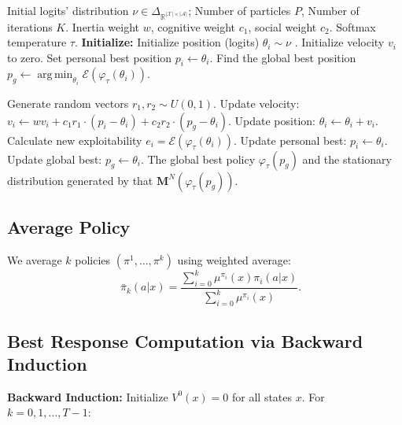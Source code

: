 \documentclass[10pt,twocolumn,letterpaper]{article}
\theoremstyle{definition}
\theoremstyle{remark}
\newcommand{\states}{\mathcal{X}}
\newcommand{\actions}{\mathcal{A}}
\DeclareMathOperator*{\argmin}{arg\,min}
\newcommand{\exploitability}{\mathcal{E}}
\begin{document}
\begin{algorithm}[H]
\small
\caption{Particle Swarm Optimization (PSO) for Exploitability Minimization}
\label{algo:pso}
\begin{algorithmic}[1]
    \REQUIRE Initial logits' distribution $\nu\in\Delta_{\mathbb{R}^{|\states|\times|\actions|}}$; Number of particles $P$, Number of iterations $K$. Inertia weight $w$, cognitive weight $c_1$, social weight $c_2$. Softmax temperature $\tau$.
    \STATE \textbf{Initialize:}
        \STATE Initialize position (logits) $\theta_i\sim\nu$ .
        \STATE Initialize velocity $v_i$ to zero.
        \STATE Set personal best position $p_i \gets \theta_i$.
    \ENDFOR
    \STATE Find the global best position $p_g \gets \argmin_{\theta_i} \exploitability(\varphi_{\tau}(\theta_i))$.

            \STATE Generate random vectors $r_1, r_2 \sim U(0, 1)$.
            \STATE Update velocity: $v_i \gets w v_i + c_1 r_1 \cdot (p_i - \theta_i) + c_2 r_2 \cdot (p_g - \theta_i)$.
            \STATE Update position: $\theta_i \gets \theta_i + v_i$.
            \STATE Calculate new exploitability $e_i = \exploitability(\varphi_{\tau}(\theta_i))$.
            \IF{$e_i < \exploitability(p_i)$}
                \STATE Update personal best: $p_i \gets \theta_i$.
            \ENDIF
            \IF{$e_i < \exploitability(p_g)$}
                \STATE Update global best: $p_g \gets \theta_i$.
            \ENDIF
        \ENDFOR
    \ENDFOR
    \ENSURE The global best policy $\varphi_{\tau}(p_g)$ and the stationary distribution generated by that $\mathbf{M}^N(\varphi_{\tau}(p_g))$.
\end{algorithmic}
\end{algorithm}


\subsection{Average Policy}\label{app:average_policy}
We average $k$ policies $(\pi^{1}, \dots, \pi^{k})$ using weighted average:
\[
\quad \bar{\pi}_k(a|x) = \frac{\sum_{i=0}^k \mu^{\pi_i}(x)\pi_i(a|x)}{\sum_{i=0}^k \mu^{\pi_i}(x)}.
\]
\subsection{Best Response Computation via Backward Induction}\label{app:br}
\textbf{Backward Induction:}
Initialize $V^0(x) = 0$ for all states $x$. For $k = 0, 1, \ldots, T-1$:
\end{document}
